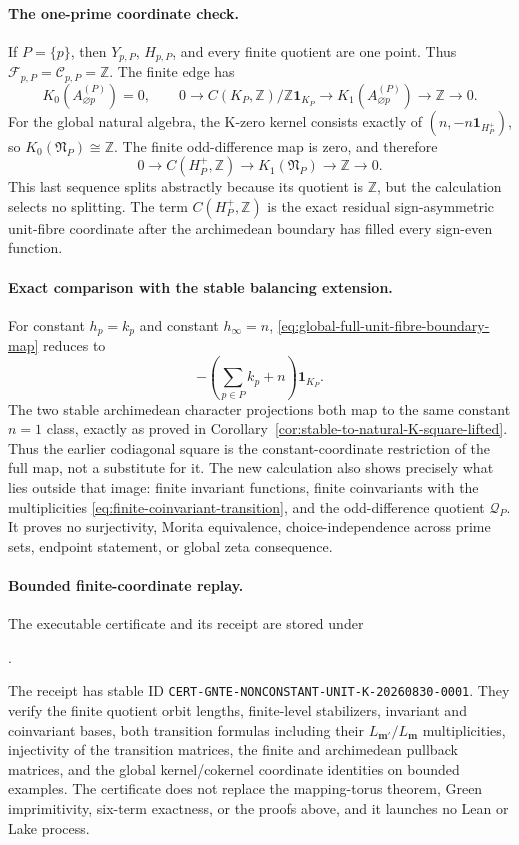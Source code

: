 \paragraph{The one-prime coordinate check.}
If \(P=\{p\}\), then \(Y_{p,P}\), \(H_{p,P}\), and every finite quotient
are one point.  Thus
\(\mathcal F_{p,P}=\mathcal C_{p,P}=\mathbb Z\).  The finite edge has
\[
 K_0(A_{\varnothing p}^{(P)})=0,
 \qquad
 0\to C(K_P,\mathbb Z)/\mathbb Z\mathbf1_{K_P}
 \to K_1(A_{\varnothing p}^{(P)})\to\mathbb Z\to0.
\]
For the global natural algebra, the K-zero kernel consists exactly of
\((n,-n\mathbf1_{H_P^+})\), so \(K_0(\mathfrak N_P)\cong\mathbb Z\).  The
finite odd-difference map is zero, and therefore
\[
 0\to C(H_P^+,\mathbb Z)\to K_1(\mathfrak N_P)\to\mathbb Z\to0.
\]
This last sequence splits abstractly because its quotient is \(\mathbb Z\),
but the calculation selects no splitting.  The term
\(C(H_P^+,\mathbb Z)\) is the exact residual sign-asymmetric unit-fibre
coordinate after the archimedean boundary has filled every sign-even function.

\paragraph{Exact comparison with the stable balancing extension.}
For constant \(h_p=k_p\) and constant \(h_\infty=n\),
\eqref{eq:global-full-unit-fibre-boundary-map} reduces to
\[
 -\left(\sum_{p\in P}k_p+n\right)\mathbf1_{K_P}.
\]
The two stable archimedean character projections both map to the same
constant \(n=1\) class, exactly as proved in
Corollary~\ref{cor:stable-to-natural-K-square-lifted}.  Thus the earlier
codiagonal square is the constant-coordinate restriction of the full map,
not a substitute for it.  The new calculation also shows precisely what lies
outside that image: finite invariant functions, finite coinvariants with the
multiplicities \eqref{eq:finite-coinvariant-transition}, and the odd-difference
quotient \(\mathcal Q_P\).  It proves no surjectivity, Morita equivalence,
choice-independence across prime sets, endpoint statement, or global zeta
consequence.

\paragraph{Bounded finite-coordinate replay.}
The executable certificate and its receipt are stored under
\begin{center}
\footnotesize
{}.
\end{center}
The receipt has stable ID
\texttt{CERT-GNTE-NONCONSTANT-UNIT-K-20260830-0001}.
They verify the finite quotient orbit lengths, finite-level stabilizers, invariant
and coinvariant bases, both transition formulas including their
\(L_{\mathbf m'}/L_{\mathbf m}\) multiplicities, injectivity of the
transition matrices, the finite and archimedean pullback matrices, and the
global kernel/cokernel coordinate identities on bounded examples.  The
certificate does not replace the mapping-torus theorem, Green imprimitivity,
six-term exactness, or the proofs above, and it launches no Lean or Lake
process.
